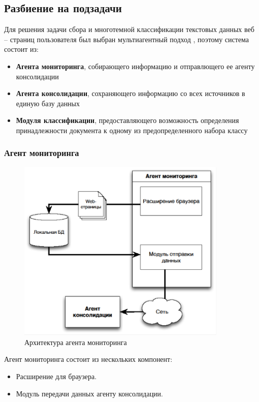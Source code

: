 \documentclass[russian, utf8, emptystyle]{eskdtext}
\begin{document}
\subsection{Разбиение на подзадачи}
Для решения задачи сбора и многотемной классификации текстовых данных веб – страниц пользователя был выбран мультиагентный подход \cite{tan}, поэтому система состоит из:
\begin{itemize}
		\item {\bf Агента мониторинга}, собирающего информацию и отправлющего ее агенту консолидации
		\item{\bf Агента консолидации}, сохраняющего информацию со всех источников в единую базу данных
		\item{\bf Модуля классификации}, предоставляющего возможность определения принадлежности документа к одному из предопределенного набора классу
\end{itemize}
\subsubsection{Агент мониторинга}
\begin{figure}[h]
	\begin{center}
		\includegraphics[width=10cm]{pic/agent1.png}
		\caption{Архитектура агента мониторинга}
		\label{fig:low_sigma}
	\end{center}
\end{figure}
Агент мониторинга состоит из нескольких компонент:
\begin{itemize}
	\item Расширение для браузера.
	\item Модуль передачи данных агенту консолидации.
\end{itemize}
\end{document}
